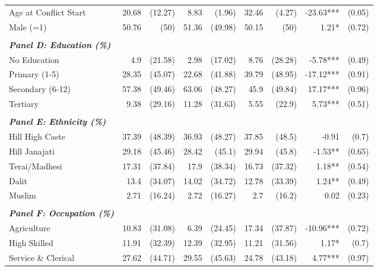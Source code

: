 \begin{landscape}
\begin{table}[!h]
{\begin{tabular}[t]{lrrrrrrrr}
Age at Conflict Start & 20.68 & (12.27) & 8.83 & (1.96) & 32.46 & (4.27) & -23.63*** & (0.05)\\
\addlinespace
Male (=1) & 50.76 & (50) & 51.36 & (49.98) & 50.15 & (50) & 1.21* & (0.72)\\
 &  &  &  &  &  &  &  & \\
\em{\textbf{Panel D: Education (\%)}} & \em{\textbf{}} & \em{\textbf{}} & \em{\textbf{}} & \em{\textbf{}} & \em{\textbf{}} & \em{\textbf{}} & \em{\textbf{}} & \em{\textbf{}}\\
No Education & 4.9 & (21.58) & 2.98 & (17.02) & 8.76 & (28.28) & -5.78*** & (0.49)\\
Primary (1-5) & 28.35 & (45.07) & 22.68 & (41.88) & 39.79 & (48.95) & -17.12*** & (0.91)\\
\addlinespace
Secondary (6-12) & 57.38 & (49.46) & 63.06 & (48.27) & 45.9 & (49.84) & 17.17*** & (0.96)\\
Tertiary & 9.38 & (29.16) & 11.28 & (31.63) & 5.55 & (22.9) & 5.73*** & (0.51)\\
 &  &  &  &  &  &  &  & \\
\em{\textbf{Panel E: Ethnicity (\%)}} & \em{\textbf{}} & \em{\textbf{}} & \em{\textbf{}} & \em{\textbf{}} & \em{\textbf{}} & \em{\textbf{}} & \em{\textbf{}} & \em{\textbf{}}\\
Hill High Caste & 37.39 & (48.39) & 36.93 & (48.27) & 37.85 & (48.5) & -0.91 & (0.7)\\
\addlinespace
Hill Janajati & 29.18 & (45.46) & 28.42 & (45.1) & 29.94 & (45.8) & -1.53** & (0.65)\\
Terai/Madhesi & 17.31 & (37.84) & 17.9 & (38.34) & 16.73 & (37.32) & 1.18** & (0.54)\\
Dalit & 13.4 & (34.07) & 14.02 & (34.72) & 12.78 & (33.39) & 1.24** & (0.49)\\
Muslim & 2.71 & (16.24) & 2.72 & (16.27) & 2.7 & (16.2) & 0.02 & (0.23)\\
 &  &  &  &  &  &  &  & \\
\addlinespace
\em{\textbf{Panel F: Occupation (\%)}} & \em{\textbf{}} & \em{\textbf{}} & \em{\textbf{}} & \em{\textbf{}} & \em{\textbf{}} & \em{\textbf{}} & \em{\textbf{}} & \em{\textbf{}}\\
Agriculture & 10.83 & (31.08) & 6.39 & (24.45) & 17.34 & (37.87) & -10.96*** & (0.72)\\
High Skilled & 11.91 & (32.39) & 12.39 & (32.95) & 11.21 & (31.56) & 1.17* & (0.7)\\
Service \& Clerical & 27.62 & (44.71) & 29.55 & (45.63) & 24.78 & (43.18) & 4.77*** & (0.97)\\

\end{tabular}}
\end{table}
\end{landscape}
